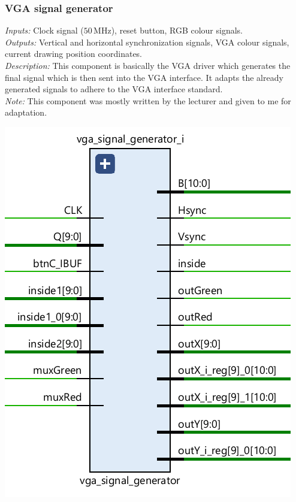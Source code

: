 \documentclass[11pt,a4paper]{article}
\def\MHz{\,\mathrm{MHz}}
\begin{document}
        \subsubsection*{VGA signal generator}
        \begin{minipage}{.45\textwidth}
            \emph{Inputs:} Clock signal ($50\MHz$), reset button, RGB colour signals.\\[1em]
            \emph{Outputs:} Vertical and horizontal synchronization signals, VGA colour signals, current drawing position coordinates.\\[1em]
            \emph{Description:} This component is basically the VGA driver which generates the final signal which is then sent into the VGA interface. It adapts the already generated signals to adhere to the VGA interface standard.\\[1em]
            \emph{Note:} This component was mostly written by the lecturer and given to me for adaptation.
        \end{minipage}
        \hfill
        \begin{minipage}{.45\textwidth}
            \includegraphics[width=\textwidth]{src/vga-signal-generator.png}
        \end{minipage}
\end{document}
